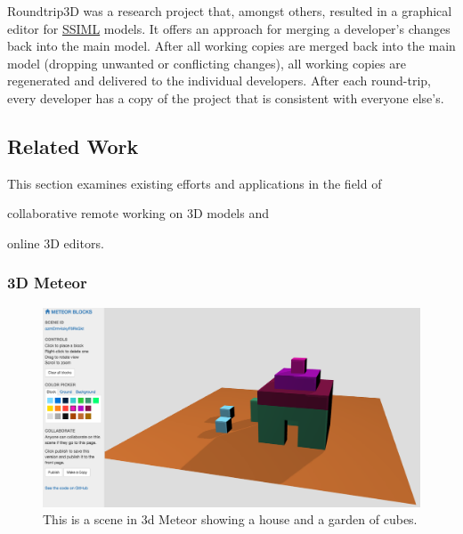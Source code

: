 Roundtrip3D was a research project that, amongst others, resulted in a
graphical editor for \hyperref[ssiml]{SSIML} models. It offers an
approach for merging a developer's changes back into the main model.
After all working copies are merged back into the main model (dropping
unwanted or conflicting changes), all working copies are regenerated and
delivered to the individual developers. After each round-trip, every
developer has a copy of the project that is consistent with everyone
else's.

\subsection{Related Work}
\label{related-work}

This section examines existing efforts and applications in the field of

\begin{itemize*}
  \item collaborative remote working on \gls{3D} models and
  \item online \gls{3D} editors.
\end{itemize*}

\subsubsection{3D Meteor}
\label{d-meteor0}

\begin{figure}[htbp]
  \centering
  \includegraphics[width=12cm]{../assets/3dmeteor.png}
  \caption{This is a scene in 3d Meteor showing a house and a garden of cubes.}
	\label{fig:3dmeteor}
\end{figure}

